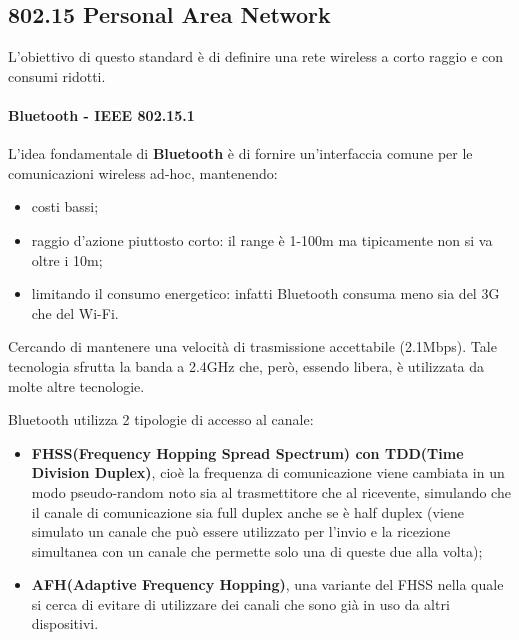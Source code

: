 \subsection{802.15 Personal Area Network}\label{personal-area-network}

L'obiettivo di questo standard è di definire una rete wireless a corto
raggio e con consumi ridotti.

\paragraph{Bluetooth - IEEE 802.15.1}
L'idea fondamentale di \textbf{Bluetooth} è di fornire un'interfaccia comune per 
le comunicazioni wireless ad-hoc, mantenendo:
\begin{itemize}
  \item costi bassi;
  \item raggio d'azione piuttosto corto: il range è 1-100m ma tipicamente non si 
        va oltre i 10m;
  \item limitando il consumo energetico: infatti Bluetooth consuma meno sia del 
        3G che del Wi-Fi. 
\end{itemize}
Cercando di mantenere una velocità di trasmissione accettabile (2.1Mbps).
Tale tecnologia sfrutta la banda a 2.4GHz che, però, essendo libera, è 
utilizzata da molte altre tecnologie. 

Bluetooth utilizza 2 tipologie di accesso al canale: 
\begin {itemize}
  \item \textbf{FHSS(Frequency Hopping Spread Spectrum) con TDD(Time Division 
        Duplex)}, cioè la frequenza di comunicazione viene cambiata in un modo 
        pseudo-random noto sia al trasmettitore che al ricevente, simulando che 
        il canale di comunicazione sia full duplex anche se è half duplex (viene 
        simulato un canale che può essere utilizzato per l'invio e la ricezione 
        simultanea con un canale che permette solo una di queste due alla volta);
  \item \textbf{AFH(Adaptive Frequency Hopping)}, una variante del FHSS nella 
        quale si cerca di evitare di utilizzare dei canali che sono già in uso 
        da altri dispositivi.
\end{itemize}

